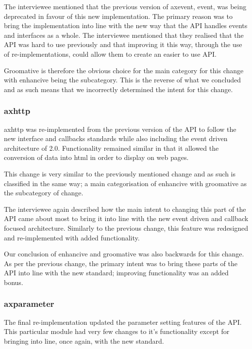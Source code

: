 \documentclass{sig-alternate}
\begin{document}
The interviewee mentioned that the previous version of axevent, event, was being deprecated in favour of this new implementation. The primary reason was to bring the implementation into line with the new way that the API handles events and interfaces as a whole. The interviewee mentioned that they realised that the API was hard to use previously and that improving it this way, through the use of re-implementations, could allow them to create an easier to use API.

Groomative is therefore the obvious choice for the main category for this change with enhancive being the subcategory. This is the reverse of what we concluded and as such means that we incorrectly determined the intent for this change.

\subsubsection{axhttp}

axhttp was re-implemented from the previous version of the API to follow the new interface and callbacks standards while also including the event driven architecture of 2.0. Functionality remained similar in that it allowed the conversion of data into html in order to display on web pages. 

This change is very similar to the previously mentioned change and as such is classified in the same way; a main categorisation of enhancive with groomative as the subcategory of change.

The interviewee again described how the main intent to changing this part of the API came about most to bring it into line with the new event driven and callback focused architecture. Similarly to the previous change, this feature was redesigned and re-implemented with added functionality.

Our conclusion of enhancive and groomative was also backwards for this change. As per the previous change, the primary intent was to bring these parts of the API into line with the new standard; improving functionality was an added bonus. 

\subsubsection{axparameter}

The final re-implementation updated the parameter setting features of the API. This particular module had very few changes to it's functionality except for bringing into line, once again, with the new standard.
\end{document}
